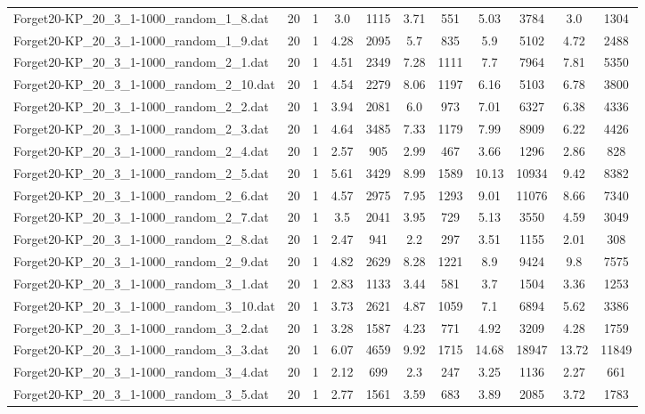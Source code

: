 \begin{table}[!ht]
\begin{tabular}{lcccccccccc}
Forget20-KP\_20\_3\_1-1000\_random\_1\_8.dat & 20 & 1 & 3.0 & 1115 & 3.71 & 551 & 5.03 & 3784 & 3.0 & 1304 \\
Forget20-KP\_20\_3\_1-1000\_random\_1\_9.dat & 20 & 1 & 4.28 & 2095 & 5.7 & 835 & 5.9 & 5102 & 4.72 & 2488 \\
Forget20-KP\_20\_3\_1-1000\_random\_2\_1.dat & 20 & 1 & 4.51 & 2349 & 7.28 & 1111 & 7.7 & 7964 & 7.81 & 5350 \\
Forget20-KP\_20\_3\_1-1000\_random\_2\_10.dat & 20 & 1 & 4.54 & 2279 & 8.06 & 1197 & 6.16 & 5103 & 6.78 & 3800 \\
Forget20-KP\_20\_3\_1-1000\_random\_2\_2.dat & 20 & 1 & 3.94 & 2081 & 6.0 & 973 & 7.01 & 6327 & 6.38 & 4336 \\
Forget20-KP\_20\_3\_1-1000\_random\_2\_3.dat & 20 & 1 & 4.64 & 3485 & 7.33 & 1179 & 7.99 & 8909 & 6.22 & 4426 \\
Forget20-KP\_20\_3\_1-1000\_random\_2\_4.dat & 20 & 1 & 2.57 & 905 & 2.99 & 467 & 3.66 & 1296 & 2.86 & 828 \\
Forget20-KP\_20\_3\_1-1000\_random\_2\_5.dat & 20 & 1 & 5.61 & 3429 & 8.99 & 1589 & 10.13 & 10934 & 9.42 & 8382 \\
Forget20-KP\_20\_3\_1-1000\_random\_2\_6.dat & 20 & 1 & 4.57 & 2975 & 7.95 & 1293 & 9.01 & 11076 & 8.66 & 7340 \\
Forget20-KP\_20\_3\_1-1000\_random\_2\_7.dat & 20 & 1 & 3.5 & 2041 & 3.95 & 729 & 5.13 & 3550 & 4.59 & 3049 \\
Forget20-KP\_20\_3\_1-1000\_random\_2\_8.dat & 20 & 1 & 2.47 & 941 & 2.2 & 297 & 3.51 & 1155 & 2.01 & 308 \\
Forget20-KP\_20\_3\_1-1000\_random\_2\_9.dat & 20 & 1 & 4.82 & 2629 & 8.28 & 1221 & 8.9 & 9424 & 9.8 & 7575 \\
Forget20-KP\_20\_3\_1-1000\_random\_3\_1.dat & 20 & 1 & 2.83 & 1133 & 3.44 & 581 & 3.7 & 1504 & 3.36 & 1253 \\
Forget20-KP\_20\_3\_1-1000\_random\_3\_10.dat & 20 & 1 & 3.73 & 2621 & 4.87 & 1059 & 7.1 & 6894 & 5.62 & 3386 \\
Forget20-KP\_20\_3\_1-1000\_random\_3\_2.dat & 20 & 1 & 3.28 & 1587 & 4.23 & 771 & 4.92 & 3209 & 4.28 & 1759 \\
Forget20-KP\_20\_3\_1-1000\_random\_3\_3.dat & 20 & 1 & 6.07 & 4659 & 9.92 & 1715 & 14.68 & 18947 & 13.72 & 11849 \\
Forget20-KP\_20\_3\_1-1000\_random\_3\_4.dat & 20 & 1 & 2.12 & 699 & 2.3 & 247 & 3.25 & 1136 & 2.27 & 661 \\
Forget20-KP\_20\_3\_1-1000\_random\_3\_5.dat & 20 & 1 & 2.77 & 1561 & 3.59 & 683 & 3.89 & 2085 & 3.72 & 1783 \\

\end{tabular}
\end{table}
